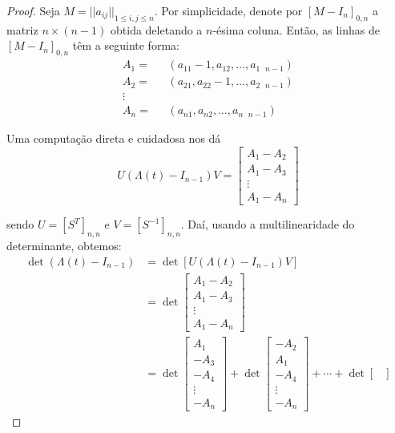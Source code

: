 \documentclass[a4paper,portuguese,11pt,twoside, leqno]{book}
\theoremstyle{definition}
\begin{document}
	\begin{proof}
		Seja $M = ||a_{ij}||_{1\leq i,j\leq n}$. Por simplicidade, denote por $[M - I_n]_{0,n}$ a matriz $n\times(n-1)$ obtida deletando a $n$-ésima coluna. Então, as linhas de $[M - I_n]_{0,n}$ têm a seguinte forma:
		\begin{align*}
		A_1 =& \text{ }(a_{11} - 1, a_{12}, \dots, a_{1\text{ }n-1}) \\
		A_2 =& \text{ }(a_{21}, a_{22} - 1, \dots, a_{2\text{ }n-1}) \\
		\vdots& \\
		A_n =& \text{ }(a_{n1}, a_{n2}, \dots, a_{n\text{ }n-1})
		\end{align*}
		\par\vspace{0.3cm} Uma computação direta e cuidadosa nos dá
		\begin{equation*}
		U(\Lambda(t) - I_{n-1})V = \begin{bmatrix}
		A_1 - A_2 \\
		A_1 - A_3 \\
		\vdots \\
		A_1 - A_n
		\end{bmatrix}
		\end{equation*}
		\par\vspace{0.3cm} sendo $U = [S^T]_{n,n}$ e $V = [S^{-1}]_{n,n}$. Daí, usando a multilinearidade do determinante, obtemos:
		\begin{align*}
		\det(\Lambda(t) - I_{n-1}) 
		&=\det[U(\Lambda(t) - I_{n-1})V] 
		\\
		&= \det\begin{bmatrix}
		A_1 - A_2\\
		A_1 - A_3 \\
		\vdots \\
		A_1 - A_n
		\end{bmatrix}
		\\
		&= \det\begin{bmatrix}
		A_1 \\
		-A_3 \\
		-A_4 \\
		\vdots \\
		-A_n
		\end{bmatrix} + \det\begin{bmatrix}
		-A_2 \\
		A_1 \\
		-A_4 \\
		\vdots\\
		-A_n
		\end{bmatrix} +\cdots + \det\begin{bmatrix}

\end{bmatrix}
\end{align*}
\end{proof}
\end{document}
